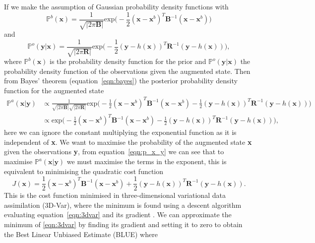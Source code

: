 If we make the assumption of Gaussian probability density functions with
\begin{equation}
\mathbb{P}^{b}(\textbf{x}) = \frac{1}{\sqrt{|2\pi\textbf{B}|}}\text{exp}\big(-\frac{1}{2}(\textbf{x}-\textbf{x}^{b})^{T}\textbf{B}^{-1}(\textbf{x}-\textbf{x}^{b})\big)
\end{equation}
and
\begin{equation}
\mathbb{P}^{o}(\textbf{y}|\textbf{x}) = \frac{1}{\sqrt{|2\pi\textbf{R}|}}\text{exp}\big(-\frac{1}{2}(\textbf{y}-h(\textbf{x}))^{T}\textbf{R}^{-1}(\textbf{y}-h(\textbf{x}))\big),
\end{equation}
where \(\mathbb{P}^{b}(\textbf{x})\) is the probability density function for the prior and \(\mathbb{P}^{o}(\textbf{y}|\textbf{x})\) the probability density function of the observations given the augmented state. Then from Bayes' theorem (equation~\eqref{eqn:bayes}) the posterior probability density function for the augmented state
\begin{equation}
\begin{split}
\mathbb{P}^{a}(\textbf{x}|\textbf{y}) &\propto \frac{1}{\sqrt{|2\pi\textbf{B}|}\sqrt{|2\pi\textbf{R}|}}\text{exp}\big(-\frac{1}{2}(\textbf{x}-\textbf{x}^{b})^{T}\textbf{B}^{-1}(\textbf{x}-\textbf{x}^{b})-\frac{1}{2}(\textbf{y}-h(\textbf{x}))^{T}\textbf{R}^{-1}(\textbf{y}-h(\textbf{x}))\big) \\
&\propto \text{exp}\big(-\frac{1}{2}(\textbf{x}-\textbf{x}^{b})^{T}\textbf{B}^{-1}(\textbf{x}-\textbf{x}^{b})-\frac{1}{2}(\textbf{y}-h(\textbf{x}))^{T}\textbf{R}^{-1}(\textbf{y}-h(\textbf{x}))\big), \label{eqn:p_x_y}
\end{split}
\end{equation} 
here we can ignore the constant multiplying the exponential function as it is independent of \textbf{x}. We want to maximise the probability of the augmented state \textbf{x} given the observations \textbf{y}, from equation~\eqref{eqn:p_x_y} we can see that to maximise \(\mathbb{P}^{a}(\textbf{x}|\textbf{y})\) we must maximise the terms in the exponent, this is equivalent to minimising the quadratic cost function 
\begin{equation}
J(\textbf{x}) = \frac{1}{2}(\textbf{x}-\textbf{x}^{b})^{T}\textbf{B}^{-1}(\textbf{x}-\textbf{x}^{b}) + \frac{1}{2}(\textbf{y}-h(\textbf{x}))^{T}\textbf{R}^{-1}(\textbf{y}-h(\textbf{x})). \label{eqn:3dvar}
\end{equation}
This is the cost function minimised in three-dimensional variational data assimilation (3D-Var), where the minimum is found using a descent algorithm evaluating equation~\eqref{eqn:3dvar} and its gradient \citep{courtier1998ecmwf}. We can approximate the minimum of \eqref{eqn:3dvar} by finding its gradient and setting it to zero to obtain the Best Linear Unbiased Estimate (BLUE) \citep{talagrand1997assimilation} where
